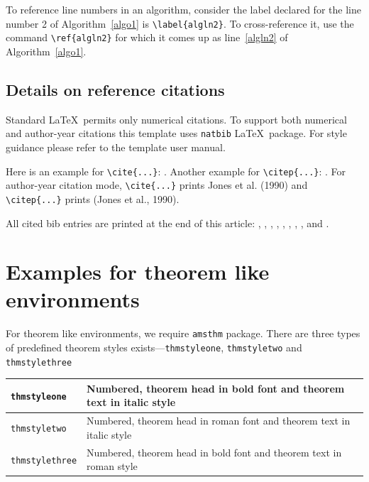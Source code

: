 \documentclass[default,pdflatex,iicol]{sn-jnl}%
\begin{document}
To reference line numbers in an algorithm, consider the label declared for the line number 2 of Algorithm~\ref{algo1} is \verb+\label{algln2}+. To cross-reference it, use the command \verb+\ref{algln2}+ for which it comes up as line~\ref{algln2} of Algorithm~\ref{algo1}.

\subsection{Details on reference citations}\label{subsec7}

Standard \LaTeX\ permits only numerical citations. To support both numerical and author-year citations this template uses \verb+natbib+ \LaTeX\ package. For style guidance please refer to the template user manual.

Here is an example for \verb+\cite{...}+: \cite{bib1}. Another example for \verb+\citep{...}+: \citep{bib2}. For author-year citation mode, \verb+\cite{...}+ prints Jones et al. (1990) and \verb+\citep{...}+ prints (Jones et al., 1990).

All cited bib entries are printed at the end of this article: \cite{bib3}, \cite{bib4}, \cite{bib5}, \cite{bib6}, \cite{bib7}, \cite{bib8}, \cite{bib9}, \cite{bib10}, \cite{bib11} and \cite{bib12}.

\section{Examples for theorem like environments}\label{sec10}

For theorem like environments, we require \verb+amsthm+ package. There are three types of predefined theorem styles exists---\verb+thmstyleone+, \verb+thmstyletwo+ and \verb+thmstylethree+ 

\bigskip
\begin{tabular}{|l|p{19pc}|}
\hline
\verb+thmstyleone+ & Numbered, theorem head in bold font and theorem text in italic style \\\hline
\verb+thmstyletwo+ & Numbered, theorem head in roman font and theorem text in italic style \\\hline
\verb+thmstylethree+ & Numbered, theorem head in bold font and theorem text in roman style \\\hline
\end{tabular}
\bigskip
\end{document}
